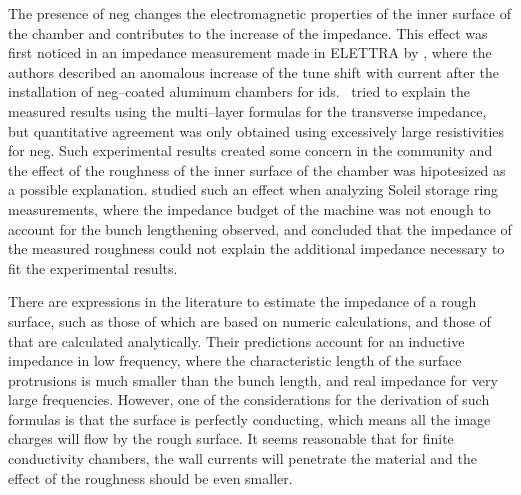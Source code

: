     The presence of \gls{neg} changes the electromagnetic properties of the inner surface of the chamber and contributes to the increase of the impedance. This effect was first noticed in an impedance measurement made in ELETTRA by , where the authors described an anomalous increase of the tune shift with current after the installation of \gls{neg}--coated aluminum chambers for \glspl{id}.~ tried to explain the measured results using the multi--layer formulas for the transverse impedance, but quantitative agreement was only obtained using excessively large resistivities for \gls{neg}. Such experimental results created some concern in the community and the effect of the roughness of the inner surface of the chamber was hipotesized as a possible explanation.  studied such an effect when analyzing Soleil storage ring measurements, where the impedance budget of the machine was not enough to account for the bunch lengthening observed, and concluded that the impedance of the measured roughness could not explain the additional impedance necessary to fit the experimental results.

    There are expressions in the literature to estimate the impedance of a rough surface, such as those of  which are based on numeric calculations, and those of  that are calculated analytically. Their predictions account for an inductive impedance in low frequency, where the characteristic length of the surface protrusions is much smaller than the bunch length, and real impedance for very large frequencies. However, one of the considerations for the derivation of such formulas is that the surface is perfectly conducting, which means all the image charges will flow by the rough surface. It seems reasonable that for finite conductivity chambers, the wall currents will penetrate the material and the effect of the roughness should be even smaller.

